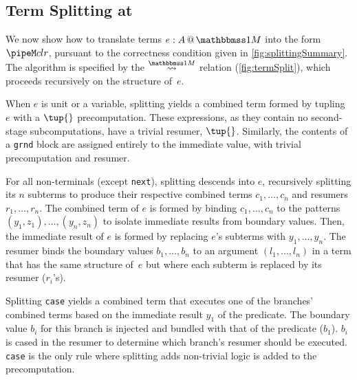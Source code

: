 \begin{abstrsyn}


\subsection{Term Splitting at \bbonem}
\label{sec:split-one}

We now show how to translate terms $\colmix e A$ into the form $\pipeM c l r$,
pursuant to the correctness condition given in \ref{fig:splittingSummary}.
The algorithm is specified by the $\splitonesym$ relation (\cref{fig:termSplit}), 
which proceeds recursively on the structure of~$e$.

When $e$ is unit or a variable,
splitting yields a combined term formed by tupling $e$ with a $\tup{}$ precomputation.
These expressions, as they contain no second-stage subcomputations, have a trivial resumer, $\tup{}$.
Similarly, the contents of a \texttt{grnd} block are assigned entirely to the immediate value,
with trivial precomputation and resumer.

For all non-terminals (except \texttt{next}),
splitting descends into $e$, recursively splitting its $n$ subterms
to produce their respective combined terms $c_1,\ldots,c_n$ and resumers $r_1, \ldots, r_n$.
The combined term of $e$ is formed by binding $c_1,\ldots,c_n$
to the patterns $(y_1,z_1),\ldots,(y_n,z_n)$
to isolate immediate results from boundary values. Then,
the immediate result of $e$ is formed by replacing $e$'s subterms with $y_1,\ldots,y_n$.
The resumer binds the boundary values $b_1,\ldots,b_n$ to an
argument $(l_1,\ldots,l_n)$ in a term that has the same structure
of~$e$ but where each subterm is replaced by its resumer ($r_i$'s).

Splitting {\tt case} yields a combined term that executes one of the branches' combined terms based on the immediate result $y_1$ of the predicate.
The boundary value $b_i$ for this branch is injected and bundled with that of the predicate ($b_1$).   
$b_i$ is cased in the resumer to determine which branch's resumer should be executed.
{\tt case} is the only rule where splitting adds non-trivial logic is added to the precomputation.


\end{abstrsyn}
